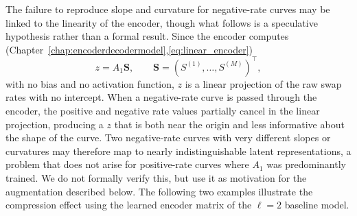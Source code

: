 The failure to reproduce slope and curvature for negative-rate curves may be linked to the linearity of the encoder, though what follows is a speculative hypothesis rather than a formal result. 
Since the encoder computes (Chapter~\ref{chap:encoderdecodermodel},\eqref{eq:linear_encoder})
$$z = A_1\mathbf{S}, \qquad \mathbf{S}=(S^{(1)},\ldots,S^{(M)})^\top,$$
with no bias and no activation function, $z$ is a linear projection of the raw swap rates with no intercept. When a negative-rate curve is passed through the encoder, the positive and negative rate values partially cancel in the linear projection, producing a $z$ that is both near the origin and less informative about the shape of the curve. Two negative-rate curves with very different slopes or curvatures may therefore map to nearly indistinguishable latent representations, a problem that does not arise for positive-rate curves where 
$A_1$ was predominantly trained. We do not formally verify this, but use it as motivation for the augmentation described below. The following two examples illustrate the compression effect using the learned encoder matrix of the $\ell=2$ baseline model.


